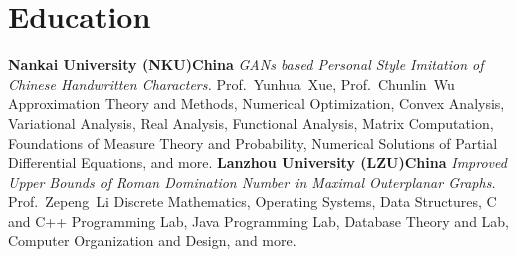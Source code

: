 \documentclass[11pt,a4paper, final]{moderncv}
\begin{document}
\section{\textbf{Education}}
	{\textbf{Nankai University (NKU)}}{}{\textbf{China}}{}
	{\emph{GANs based Personal Style Imitation of Chinese Handwritten Characters.}}
	{Prof.~Yunhua~Xue, Prof.~Chunlin~Wu}
	{Approximation Theory and Methods, Numerical Optimization, Convex Analysis, 
	Variational Analysis, Real Analysis, Functional Analysis, Matrix Computation, 
	Foundations of Measure Theory and Probability, Numerical Solutions of Partial Differential Equations, and more.}
	{\textbf{Lanzhou University (LZU)}}{}{\textbf{China}}{}
	{\emph{Improved Upper Bounds of Roman Domination Number in Maximal Outerplanar Graphs.}}
	{Prof.~Zepeng~Li}
	{Discrete Mathematics, Operating Systems, Data Structures, C and C++ Programming Lab, 
	Java Programming Lab, Database Theory and Lab, Computer Organization and Design, and more.}
\end{document}
